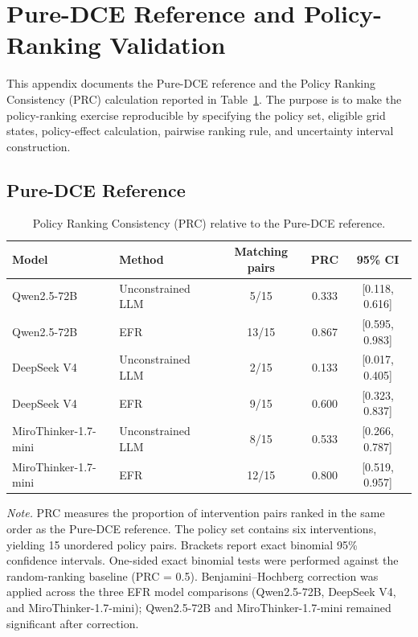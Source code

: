 \documentclass[11pt]{article}
\begin{document}
\section{Pure-DCE Reference and Policy-Ranking Validation}\label{sec:heldout_validation}
\label{app:pure_dce_prc}

This appendix documents the Pure-DCE reference and the Policy Ranking Consistency (PRC) calculation reported in Table~\ref{tab:prc}. The purpose is to make the policy-ranking exercise reproducible by specifying the policy set, eligible grid states, policy-effect calculation, pairwise ranking rule, and uncertainty interval construction.

\subsection{Pure-DCE Reference}

\begin{table}[t]
\centering
\caption{Policy Ranking Consistency (PRC) relative to the Pure-DCE reference.}
\label{tab:prc}
\small
\setlength{\tabcolsep}{5pt}
\begin{tabular}{l l c c c}
\toprule
Model & Method & Matching pairs & PRC & 95\% CI \\
\midrule
Qwen2.5-72B & Unconstrained LLM & 5/15 & 0.333 & [0.118, 0.616] \\
Qwen2.5-72B & EFR & 13/15 & 0.867 & [0.595, 0.983] \\
\midrule
DeepSeek V4 & Unconstrained LLM & 2/15 & 0.133 & [0.017, 0.405] \\
DeepSeek V4 & EFR & 9/15 & 0.600 & [0.323, 0.837] \\
\midrule
MiroThinker-1.7-mini & Unconstrained LLM & 8/15 & 0.533 & [0.266, 0.787] \\
MiroThinker-1.7-mini & EFR & 12/15 & 0.800 & [0.519, 0.957] \\
\bottomrule
\end{tabular}

\vspace{0.4em}
\begin{minipage}{0.95\textwidth}
\small
\textit{Note.} PRC measures the proportion of intervention pairs ranked in the same order as the Pure-DCE reference. The policy set contains six interventions, yielding 15 unordered policy pairs. Brackets report exact binomial 95\% confidence intervals. One-sided exact binomial tests were performed against the random-ranking baseline (PRC = 0.5). Benjamini--Hochberg correction was applied across the three EFR model comparisons (Qwen2.5-72B, DeepSeek V4, and MiroThinker-1.7-mini); Qwen2.5-72B and MiroThinker-1.7-mini remained significant after correction.
\end{minipage}
\end{table}
\end{document}
